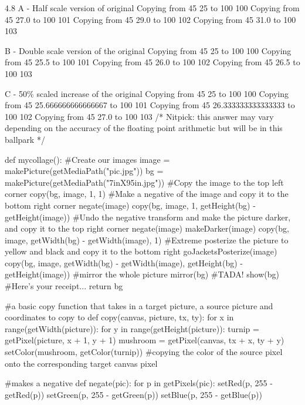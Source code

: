 \begin{exercises}
\begin{ex}
\begin{itemize}
\end{ex}


\begin{ex}

4.8
A - Half scale version of original
Copying from 45 25 to 100 100
Copying from 45 27.0 to 100 101
Copying from 45 29.0 to 100 102
Copying from 45 31.0 to 100 103

B - Double scale version of the original
Copying from 45 25 to 100 100
Copying from 45 25.5 to 100 101
Copying from 45 26.0 to 100 102
Copying from 45 26.5 to 100 103

C - 50\% scaled increase of the original
Copying from 45 25 to 100 100
Copying from 45 25.666666666666667 to 100 101
Copying from 45 26.333333333333333 to 100 102
Copying from 45 27.0 to 100 103 /* Nitpick: this answer may vary depending
on the accuracy of the floating point arithmetic but will be in this
ballpark */

\end{ex}



\begin{ex}
\begin{example}
def mycollage():
  #Create our images
  image = makePicture(getMediaPath("pic.jpg"))
  bg = makePicture(getMediaPath("7inX95in.jpg"))
  #Copy the image to the top left corner
  copy(bg, image, 1, 1)
  #Make a negative of the image and copy it to the bottom right corner
  negate(image)
  copy(bg, image, 1, getHeight(bg) - getHeight(image))
  #Undo the negative transform and make the picture darker, and copy it to
the top right corner
  negate(image)
  makeDarker(image)
  copy(bg, image, getWidth(bg) - getWidth(image), 1)
  #Extreme posterize the picture to yellow and black and copy it to the
bottom right
  goJacketsPosterize(image)
  copy(bg, image, getWidth(bg) - getWidth(image), getHeight(bg) -
getHeight(image))
  #mirror the whole picture
  mirror(bg)
  #TADA!
  show(bg)
  #Here's your receipt...
  return bg

#a basic copy function that takes in a target picture, a source picture and
coordinates to copy to
def copy(canvas, picture, tx, ty):
  for x in range(getWidth(picture)):
    for y in range(getHeight(picture)):
      turnip = getPixel(picture, x + 1, y + 1)
      mushroom = getPixel(canvas, tx + x, ty + y)
      setColor(mushroom, getColor(turnip)) #copying the color of the source
pixel onto the corresponding target canvas pixel

#makes a negative
def negate(pic):
  for p in getPixels(pic):
    setRed(p, 255 - getRed(p))
    setGreen(p, 255 - getGreen(p))
    setBlue(p, 255 - getBlue(p))


\end{example}
\end{ex}
\end{exercises}
